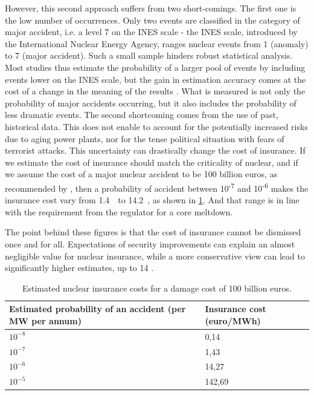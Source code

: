 However, this second approach suffers from two short-comings. The first one is the low number of occurrences. Only two events are classified in the category of major accident, i.e. a level 7 on the INES scale - the INES scale, introduced by the International Nuclear Energy Agency, ranges nuclear events from 1 (anomaly) to 7 (major accident). Such a small sample hinders robust statistical analysis. Most studies thus estimate the probability of a larger pool of events by including events lower on the INES scale, but the gain in estimation accuracy comes at the cost of a change in the meaning of the results \citep{Rangel2014}. What is measured is not only the probability of major accidents occurring, but it also includes the probability of less dramatic events. 
The second shortcoming comes from the use of past, historical data. This does not enable to account for the potentially increased risks due to aging power plants, nor for the tense political situation with fears of terrorist attacks. 
This uncertainty can drastically change the cost of insurance. If we estimate the cost of insurance should match the criticality of nuclear, and if we assume the cost of a major nuclear accident to be 100 billion euros, as recommended by \citet{CourdesComptes2012}, then a probability of accident between 10\textsuperscript{-7} and 10\textsuperscript{-6} makes the insurance cost vary from 1.4~\emwh\ to 14.2~\emwh, as shown in \cref{tab:insurance}. 
And that range is in line with the requirement from the regulator for a core meltdown.

The point behind these figures is that the cost of insurance cannot be dismissed once and for all. Expectations of security improvements can explain an almost negligible value for nuclear insurance, while a more conservative view can lead to significantly higher estimates, up to 14 \emwh. 

\begin{table}
	\centering
	\caption{Estimated nuclear insurance costs for a damage cost of 100 billion euros.}
	\label{tab:insurance}
	\begin{tabular}{p{2cm}p{6cm}}
		\toprule
		Estimated probability of an accident \newline (per MW per annum) & Insurance cost (euro/MWh) \\
		\midrule
		$10^{-8}$  & 0,14 \\
		$10^{-7}$  & 1,43 \\
		$10^{-6}$  & 14,27 \\
		$10^{-5}$  & 142,69 \\
		\bottomrule
	\end{tabular}  
\end{table}



